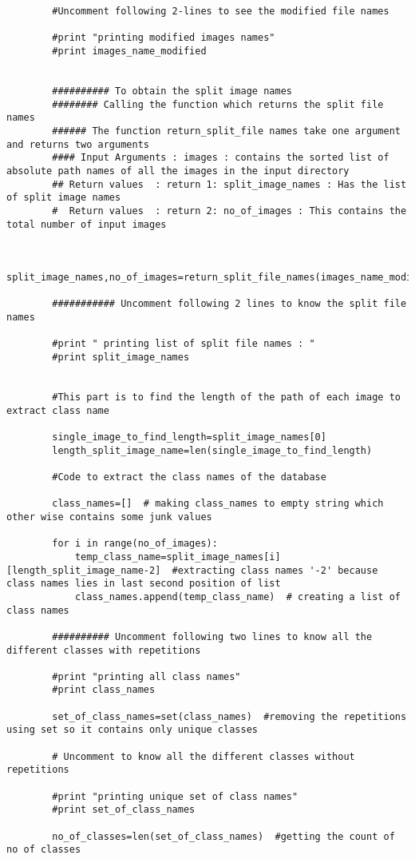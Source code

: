 \documentclass[10pt,a4paper]{article}
\begin{document}
\begin{lstlisting}
		#Uncomment following 2-lines to see the modified file names
	
		#print "printing modified images names"
		#print images_name_modified


		########## To obtain the split image names
		######## Calling the function which returns the split file names 
		###### The function return_split_file names take one argument and returns two arguments
		#### Input Arguments : images : contains the sorted list of absolute path names of all the images in the input directory
		## Return values  : return 1: split_image_names : Has the list of split image names
		#  Return values  : return 2: no_of_images : This contains the total number of input images


		split_image_names,no_of_images=return_split_file_names(images_name_modified)

		########### Uncomment following 2 lines to know the split file names

		#print " printing list of split file names : "	
		#print split_image_names


		#This part is to find the length of the path of each image to extract class name
	
		single_image_to_find_length=split_image_names[0]
		length_split_image_name=len(single_image_to_find_length)

		#Code to extract the class names of the database

		class_names=[]  # making class_names to empty string which other wise contains some junk values

		for i in range(no_of_images):
			temp_class_name=split_image_names[i][length_split_image_name-2]  #extracting class names '-2' because class names lies in last second position of list
			class_names.append(temp_class_name)  # creating a list of class names 

		########## Uncomment following two lines to know all the different classes with repetitions
	
		#print "printing all class names"
		#print class_names

		set_of_class_names=set(class_names)  #removing the repetitions using set so it contains only unique classes

		# Uncomment to know all the different classes without repetitions

		#print "printing unique set of class names"
		#print set_of_class_names

		no_of_classes=len(set_of_class_names)  #getting the count of no of classes
		

\end{lstlisting}
\end{document}
